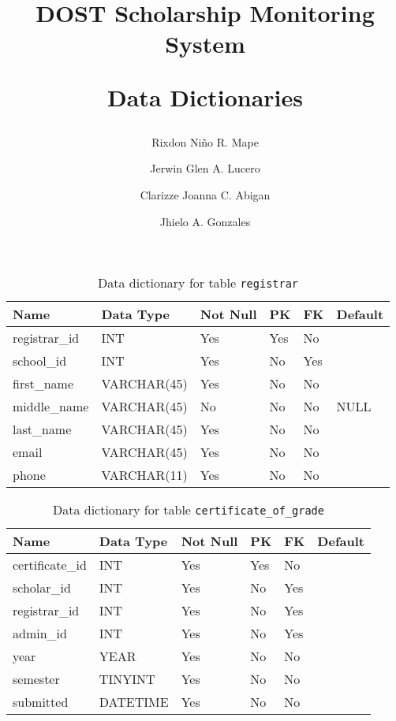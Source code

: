 \documentclass{article}
\newcommand{\tname}[1]{\color{blue}\texttt{#1}}
\begin{document}
\title{
    DOST Scholarship Monitoring System \par
    \Large Data Dictionaries
}
\author[1]{Rixdon Niño R. Mape}
\author[1]{Jerwin Glen A. Lucero}
\author[1]{Clarizze Joanna C. Abigan}
\author[1]{Jhielo A. Gonzales}
\date{}
\maketitle

\begin{table}[H]
    \centering
    \begin{tabularx}{\textwidth}{m{1.0in}Xllll}
        \hline
        Name          & Data Type   & Not Null & PK  & FK  & Default \\ \hline
        registrar\_id & INT         & Yes      & Yes & No  & ~       \\
        school\_id    & INT         & Yes      & No  & Yes & ~       \\
        first\_name   & VARCHAR(45) & Yes      & No  & No  & ~       \\
        middle\_name  & VARCHAR(45) & No       & No  & No  & NULL    \\
        last\_name    & VARCHAR(45) & Yes      & No  & No  & ~       \\
        email         & VARCHAR(45) & Yes      & No  & No  & ~       \\
        phone         & VARCHAR(11) & Yes      & No  & No  & ~       \\
    \end{tabularx}
    \caption{Data dictionary for table \tname{registrar}}
\end{table}

\begin{table}[H]
    \centering
    \begin{tabularx}{\textwidth}{m{1.0in}Xllll}
        \hline
        Name            & Data Type & Not Null & PK  & FK  & Default \\ \hline
        certificate\_id & INT       & Yes      & Yes & No  & ~       \\
        scholar\_id     & INT       & Yes      & No  & Yes & ~       \\
        registrar\_id   & INT       & Yes      & No  & Yes & ~       \\
        admin\_id       & INT       & Yes      & No  & Yes & ~       \\
        year            & YEAR      & Yes      & No  & No  & ~       \\
        semester        & TINYINT   & Yes      & No  & No  & ~       \\
        submitted       & DATETIME  & Yes      & No  & No  & ~       \\
    \end{tabularx}
    \caption{Data dictionary for table \tname{certificate\_of\_grade}}
\end{table}
\end{document}
